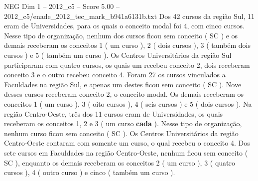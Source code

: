 \begin{textsample}{NEG Dim 1 – 2012\_c5 – Score 5.00 – 2012\_c5/enade\_2012\_tec\_mark\_b941a6131b.txt}
Dos 42 cursos da região Sul, 11 eram de Universidades, para os quais o conceito modal foi 4, com cinco cursos.
Nesse tipo de organização, nenhum dos cursos ficou sem conceito ( SC ) e os demais receberam os conceitos 1 ( um curso ), 2 ( dois cursos ), 3 ( também dois cursos ) e 5 ( também um curso ).
Os Centros Universitários da região Sul participaram com quatro cursos, os quais um recebeu conceito 2, dois receberam conceito 3 e o outro recebeu conceito 4.
Foram 27 os cursos vinculados a Faculdades na região Sul, e apenas um destes ficou sem conceito ( SC ).
Nove desses cursos receberam conceito 2, o conceito modal.
Os demais receberam os conceitos 1 ( um curso ), 3 ( oito cursos ), 4 ( seis cursos ) e 5 ( dois cursos ).
Na região Centro-Oeste, três dos 11 cursos eram de Universidades, os quais receberam os conceitos 1, 2 e 3 ( um curso \textbf{cada} ).
Nesse tipo de organização, nenhum curso ficou sem conceito ( SC ).
Os Centros Universitários da região Centro-Oeste contaram com somente um curso, o qual recebeu o conceito 4.
Dos sete cursos em Faculdades na região Centro-Oeste, nenhum ficou sem conceito ( SC ), enquanto os demais receberam os conceitos 2 ( um curso ), 3 ( quatro cursos ), 4 ( outro curso ) e cinco ( também um curso ).

\end{textsample}
